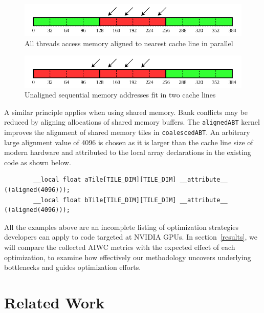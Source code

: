 \documentclass[review=false, sigchi]{acmart}
\begin{document}
	\begin{figure}[h]
		\includegraphics[width=\linewidth]{aligned_access_coalescing.pdf}
		\caption{All threads access memory aligned to nearest cache line in parallel \cite{cudaoptimisation}}
		\label{fig: Simple memory alignment}
	\end{figure}
	
	\begin{figure}[h]
		\includegraphics[width=\linewidth]{misaligned_access_coalescing.pdf}
		\caption{Unaligned sequential memory addresses fit in two cache lines \cite{cudaoptimisation}}
		\label{fig: Simple memory misalignment}
	\end{figure}
	
	A similar principle applies when using shared memory. Bank conflicts may be reduced by aligning allocations of shared memory buffers. The \texttt{alignedABT} kernel improves the alignment of shared memory tiles in \texttt{coalescedABT}.
	An arbitrary large alignment value of 4096 is chosen as it is larger than the cache line size of modern hardware and attributed to the local array declarations in the existing code as shown below.
	
	\begin{lstlisting}
		__local float aTile[TILE_DIM][TILE_DIM] __attribute__ ((aligned(4096)));
		__local float bTile[TILE_DIM][TILE_DIM] __attribute__ ((aligned(4096)));
	\end{lstlisting}
	
	All the examples above are an incomplete listing of optimization strategies developers can apply to code targeted at NVIDIA GPUs.
	In section~\ref{results}, we will compare the collected AIWC metrics with the expected effect of each optimization, to examine how effectively our methodology uncovers underlying bottlenecks and guides optimization efforts.
	
	\flushbottom
	\section{Related Work} \label{related work}
	
\end{document}

